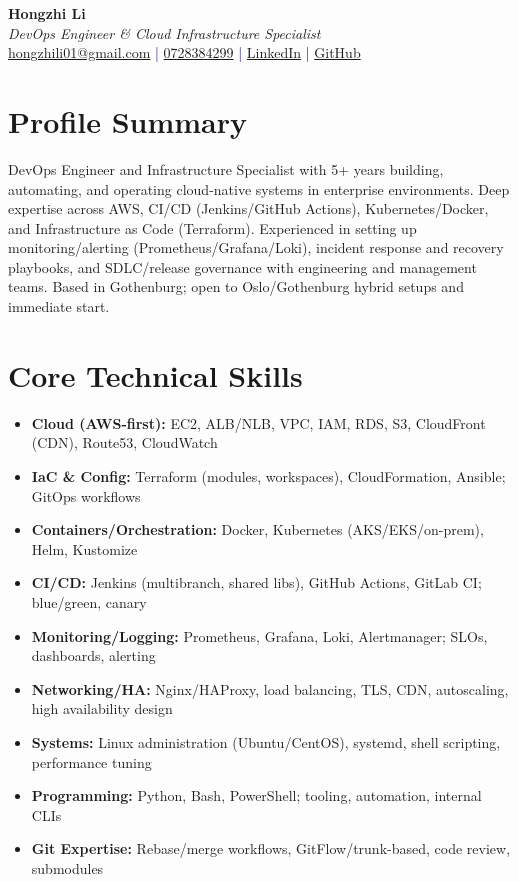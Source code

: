 \documentclass[11pt,a4paper]{article}
\begin{document}
\pagestyle{empty} %

\begin{center}
{\LARGE \textbf{Hongzhi Li}}\\[10pt]
{\Large \textit{DevOps Engineer \& Cloud Infrastructure Specialist}}\\[10pt]
\textcolor{darkblue}{\href{mailto:hongzhili01@gmail.com}{hongzhili01@gmail.com} | \href{tel:0728384299}{0728384299} | \href{https://www.linkedin.com/in/hzl/}{LinkedIn} | \href{https://github.com/bluehawana}{GitHub}}
\end{center}

\section*{Profile Summary}
DevOps Engineer and Infrastructure Specialist with 5+ years building, automating, and operating cloud-native systems in enterprise environments. Deep expertise across AWS, CI/CD (Jenkins/GitHub Actions), Kubernetes/Docker, and Infrastructure as Code (Terraform). Experienced in setting up monitoring/alerting (Prometheus/Grafana/Loki), incident response and recovery playbooks, and SDLC/release governance with engineering and management teams. Based in Gothenburg; open to Oslo/Gothenburg hybrid setups and immediate start.

\section*{Core Technical Skills}
\begin{itemize}[noitemsep]
\item \textbf{Cloud (AWS-first):} EC2, ALB/NLB, VPC, IAM, RDS, S3, CloudFront (CDN), Route53, CloudWatch
\item \textbf{IaC \& Config:} Terraform (modules, workspaces), CloudFormation, Ansible; GitOps workflows
\item \textbf{Containers/Orchestration:} Docker, Kubernetes (AKS/EKS/on-prem), Helm, Kustomize
\item \textbf{CI/CD:} Jenkins (multibranch, shared libs), GitHub Actions, GitLab CI; blue/green, canary
\item \textbf{Monitoring/Logging:} Prometheus, Grafana, Loki, Alertmanager; SLOs, dashboards, alerting
\item \textbf{Networking/HA:} Nginx/HAProxy, load balancing, TLS, CDN, autoscaling, high availability design
\item \textbf{Systems:} Linux administration (Ubuntu/CentOS), systemd, shell scripting, performance tuning
\item \textbf{Programming:} Python, Bash, PowerShell; tooling, automation, internal CLIs
\item \textbf{Git Expertise:} Rebase/merge workflows, GitFlow/trunk-based, code review, submodules
\end{itemize}
\end{document}
